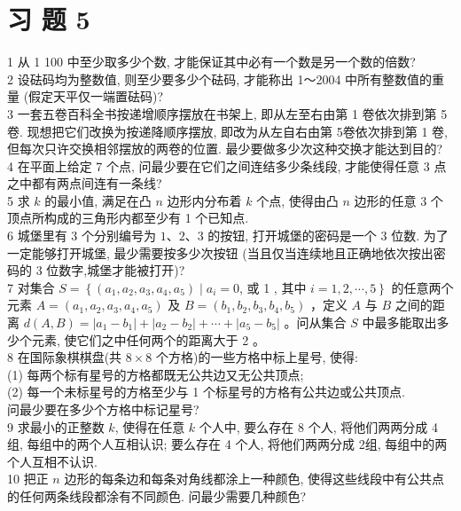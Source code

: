 \documentclass[10pt]{article}
\begin{document}
\section{习 题 5}
1 从 1 100 中至少取多少个数, 才能保证其中必有一个数是另一个数的倍数?\\
2 设砝码均为整数值, 则至少要多少个砝码, 才能称出 1～2004 中所有整数值的重量 (假定天平仅一端置砝码)?\\
3 一套五卷百科全书按递增顺序摆放在书架上, 即从左至右由第 1 卷依次排到第 5 卷. 现想把它们改换为按递降顺序摆放, 即改为从左自右由第 5卷依次排到第 1 卷, 但每次只许交换相邻摆放的两卷的位置. 最少要做多少次这种交换才能达到目的?\\
4 在平面上给定 7 个点, 问最少要在它们之间连结多少条线段, 才能使得任意 3 点之中都有两点间连有一条线?\\
5 求 $k$ 的最小值, 满足在凸 $n$ 边形内分布着 $k$ 个点, 使得由凸 $n$ 边形的任意 3 个顶点所构成的三角形内都至少有 1 个已知点.\\
6 城堡里有 3 个分别编号为 $1 、 2 、 3$ 的按钮, 打开城堡的密码是一个 3 位数. 为了一定能够打开城堡, 最少需要按多少次按钮 (当且仅当连续地且正确地依次按出密码的 3 位数字,城堡才能被打开)?\\
7 对集合 $S=\left\{\left(a_{1}, a_{2}, a_{3}, a_{4}, a_{5}\right) \mid a_{i}=0\right.$, 或 1 , 其中 $\left.i=1,2, \cdots, 5\right\}$ 的任意两个元素 $A=\left(a_{1}, a_{2}, a_{3}, a_{4}, a_{5}\right)$ 及 $B=\left(b_{1}, b_{2}, b_{3}, b_{4}, b_{5}\right)$ ，定义 $A$ 与 $B$ 之间的距离 $d(A, B)=\left|a_{1}-b_{1}\right|+\left|a_{2}-b_{2}\right|+\cdots+\left|a_{5}-b_{5}\right|$ 。问从集合 $S$ 中最多能取出多少个元素, 使它们之中任何两个的距离大于 2 。\\
8 在国际象棋棋盘(共 $8 \times 8$ 个方格)的一些方格中标上星号, 使得:\\
(1) 每两个标有星号的方格都既无公共边又无公共顶点;\\
(2) 每一个未标星号的方格至少与 1 个标星号的方格有公共边或公共顶点.\\
问最少要在多少个方格中标记星号?\\
9 求最小的正整数 $k$, 使得在任意 $k$ 个人中, 要么存在 8 个人, 将他们两两分成 4 组, 每组中的两个人互相认识; 要么存在 4 个人, 将他们两两分成 2组, 每组中的两个人互相不认识.\\
10 把正 $n$ 边形的每条边和每条对角线都涂上一种颜色, 使得这些线段中有公共点的任何两条线段都涂有不同颜色. 问最少需要几种颜色?
\end{document}
